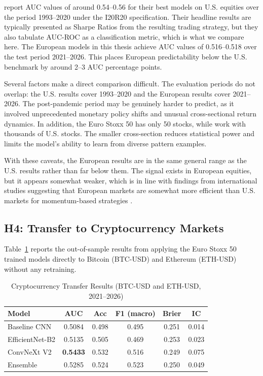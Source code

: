 \textcite{Jiang2023} report AUC values of around 0.54--0.56 for their best models on U.S. equities over the period 1993--2020 under the I20R20 specification. Their headline results are typically presented as Sharpe Ratios from the resulting trading strategy, but they also tabulate AUC-ROC as a classification metric, which is what we compare here. The European models in this thesis achieve AUC values of 0.516--0.518 over the test period 2021--2026. This places European predictability below the U.S. benchmark by around 2--3 AUC percentage points.

Several factors make a direct comparison difficult. The evaluation periods do not overlap: the U.S. results cover 1993--2020 and the European results cover 2021--2026. The post-pandemic period may be genuinely harder to predict, as it involved unprecedented monetary policy shifts and unusual cross-sectional return dynamics. In addition, the Euro Stoxx 50 has only 50 stocks, while \textcite{Jiang2023} work with thousands of U.S. stocks. The smaller cross-section reduces statistical power and limits the model's ability to learn from diverse pattern examples.

With these caveats, the European results are in the same general range as the U.S. results rather than far below them. The signal exists in European equities, but it appears somewhat weaker, which is in line with findings from international studies suggesting that European markets are somewhat more efficient than U.S. markets for momentum-based strategies \parencite{cakici2023}.

\subsection{H4: Transfer to Cryptocurrency Markets}
\label{sec:res_h4}

Table~\ref{tab:crypto_metrics} reports the out-of-sample results from applying the Euro Stoxx 50 trained models directly to Bitcoin (BTC-USD) and Ethereum (ETH-USD) without any retraining.

\begin{table}[H]
\centering
\caption{Cryptocurrency Transfer Results (BTC-USD and ETH-USD, 2021--2026)}
\label{tab:crypto_metrics}
\small
\begin{tabular}{lccccc}
\toprule
\textbf{Model} & \textbf{AUC} & \textbf{Acc} & \textbf{F1 (macro)} & \textbf{Brier} & \textbf{IC} \\
\midrule
Baseline CNN   & 0.5084 & 0.498 & 0.495 & 0.251 & 0.014 \\
EfficientNet-B2 & 0.5135 & 0.505 & 0.469 & 0.253 & 0.023 \\
ConvNeXt V2    & \textbf{0.5433} & 0.532 & 0.516 & 0.249 & 0.075 \\
Ensemble       & 0.5285 & 0.524 & 0.523 & 0.250 & 0.049 \\
\bottomrule
\end{tabular}
\end{table}

